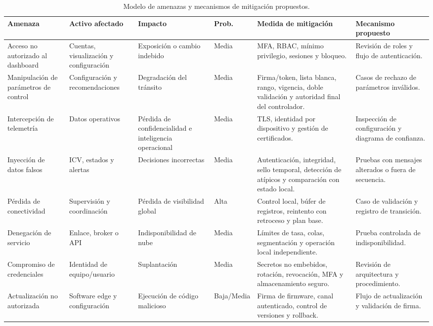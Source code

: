 \begin{landscape}
\footnotesize
\begin{table}[H]
  \centering
  \caption{Modelo de amenazas y mecanismos de mitigación propuestos.}
  \label{tab:amenazas}
  \begin{tabular}{@{}p{3.6cm}p{3.0cm}p{3.0cm}p{1.8cm}p{5.4cm}p{3.6cm}@{}}
\toprule
\textbf{Amenaza} & \textbf{Activo afectado} & \textbf{Impacto} & \textbf{Prob.} & \textbf{Medida de mitigación} & \textbf{Mecanismo propuesto}\\
\midrule
Acceso no autorizado al dashboard & Cuentas, visualización y configuración & Exposición o cambio indebido & Media & MFA, RBAC, mínimo privilegio, sesiones y bloqueo. & Revisión de roles y flujo de autenticación.\\
Manipulación de parámetros de control & Configuración y recomendaciones & Degradación del tránsito & Media & Firma/token, lista blanca, rango, vigencia, doble validación y autoridad final del controlador. & Casos de rechazo de parámetros inválidos.\\
Intercepción de telemetría & Datos operativos & Pérdida de confidencialidad e inteligencia operacional & Media & TLS, identidad por dispositivo y gestión de certificados. & Inspección de configuración y diagrama de confianza.\\
Inyección de datos falsos & ICV, estados y alertas & Decisiones incorrectas & Media & Autenticación, integridad, sello temporal, detección de atípicos y comparación con estado local. & Pruebas con mensajes alterados o fuera de secuencia.\\
Pérdida de conectividad & Supervisión y coordinación & Pérdida de visibilidad global & Alta & Control local, búfer de registros, reintento con retroceso y plan base. & Caso de validación y registro de transición.\\
Denegación de servicio & Enlace, broker o API & Indisponibilidad de nube & Media & Límites de tasa, colas, segmentación y operación local independiente. & Prueba controlada de indisponibilidad.\\
Compromiso de credenciales & Identidad de equipo/usuario & Suplantación & Media & Secretos no embebidos, rotación, revocación, MFA y almacenamiento seguro. & Revisión de arquitectura y procedimiento.\\
Actualización no autorizada & Software edge y configuración & Ejecución de código malicioso & Baja/Media & Firma de firmware, canal autenticado, control de versiones y rollback. & Flujo de actualización y validación de firma.\\

\end{tabular}
\end{table}
\end{landscape}
